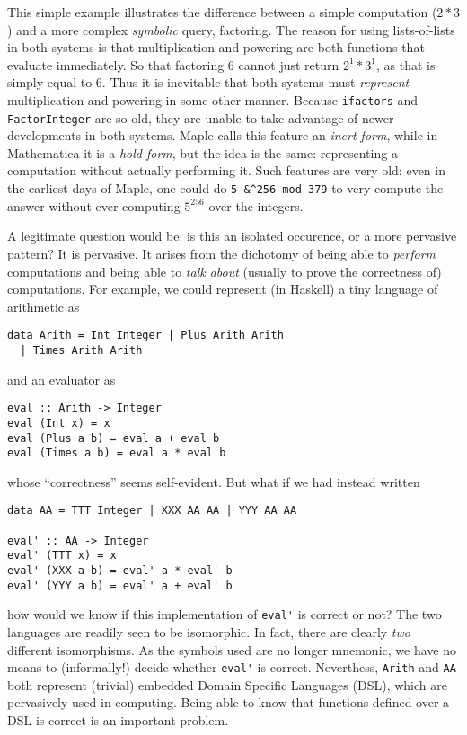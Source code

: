 \documentclass[fleqn]{llncs}
\begin{document}
This simple example illustrates the difference between a simple
computation ($2 * 3$) and a more complex \emph{symbolic} query, factoring.
The reason for using lists-of-lists in both systems is that multiplication
and powering are both functions that evaluate immediately.  So that
factoring 6 cannot just return $2^1 * 3^1$, as that is simply equal to $6$.
Thus it is inevitable that both systems must \emph{represent} multiplication
and powering in some other manner.  Because \texttt{ifactors} and
\texttt{FactorInteger} are so old, they are unable to take advantage of
newer developments in both systems.  Maple calls this feature an
\emph{inert form}, while in Mathematica it is a \emph{hold form}, but
the idea is the same: representing a computation without actually
performing it. Such features are very old: even in the earliest days
of Maple, one could do \texttt{5 \&\textasciicircum 256 mod 379} to
very compute the answer without ever computing $5^{256}$ over the 
integers.

A legitimate question would be: is this an isolated occurence, or a
more pervasive pattern? It is pervasive. It arises from the dichotomy
of being able to \emph{perform} computations and being able to
\emph{talk about} (usually to prove the correctness of) computations.
For example, we could represent (in Haskell) a tiny language of
arithmetic as
\begin{lstlisting}
data Arith = Int Integer | Plus Arith Arith 
  | Times Arith Arith
\end{lstlisting}
\noindent and an evaluator as
\begin{lstlisting}
eval :: Arith -> Integer
eval (Int x) = x
eval (Plus a b) = eval a + eval b
eval (Times a b) = eval a * eval b
\end{lstlisting}
\noindent whose ``correctness'' seems self-evident.  But what if we had
instead written
\begin{lstlisting}
data AA = TTT Integer | XXX AA AA | YYY AA AA

eval' :: AA -> Integer
eval' (TTT x) = x
eval' (XXX a b) = eval' a * eval' b
eval' (YYY a b) = eval' a + eval' b
\end{lstlisting}
how would we know if this implementation of \lstinline|eval'| is correct
or not?  The two languages are readily seen to be isomorphic.  In fact,
there are clearly \emph{two} different isomorphisms. As the symbols used are
no longer mnemonic, we have no means to (informally!) decide whether
\lstinline|eval'| is correct.  Neverthess, \lstinline|Arith| and
\lstinline|AA| both represent (trivial) embedded Domain Specific Languages
(DSL), which are pervasively used in computing. Being able to know that
functions defined over a DSL is correct is an important problem.
\end{document}
